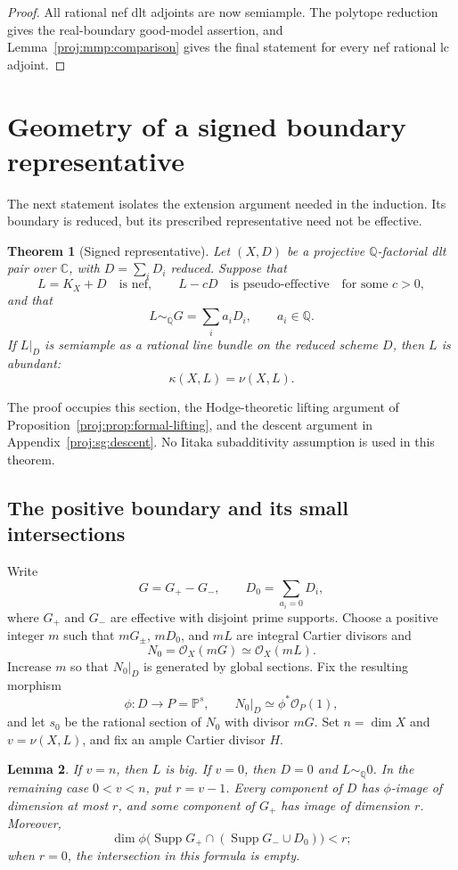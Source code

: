 \documentclass[11pt,letterpaper]{article}
\newcommand{\Q}{\mathbb{Q}}
\newcommand{\C}{\mathbb{C}}
\newcommand{\PP}{\mathbb{P}}
\newcommand{\OO}{\mathcal{O}}
\DeclareMathOperator{\Supp}{Supp}
\newtheorem{theorem}{Theorem}[section]
\newtheorem{lemma}[theorem]{Lemma}
\theoremstyle{definition}
\theoremstyle{remark}
\begin{document}
\begin{proof}
All rational nef dlt adjoints are now semiample.
The polytope reduction gives the real-boundary good-model
assertion, and Lemma~\ref{proj:mmp:comparison} gives the final
statement for every nef rational lc adjoint.
\end{proof}

\section{Geometry of a signed boundary representative}
\label{proj:sg:section}

The next statement isolates the extension argument needed in the
induction.  Its boundary is reduced, but its prescribed representative
need not be effective.

\begin{theorem}[Signed representative]\label{proj:thm:signed}
Let $(X,D)$ be a projective $\Q$-factorial dlt pair over $\C$, with
$D=\sum_iD_i$ reduced.  Suppose that
\[
 L=K_X+D\quad\text{is nef},\qquad L-cD\quad\text{is pseudo-effective}
 \quad\text{for some }c>0,
\]
and that
\[
 L\sim_{\Q}G=\sum_i a_iD_i,\qquad a_i\in\Q.
\]
If $L|_D$ is semiample as a rational line bundle on the reduced scheme
$D$, then $L$ is abundant:
\[
 \kappa(X,L)=\nu(X,L).
\]
\end{theorem}

The proof occupies this section, the Hodge-theoretic lifting argument
of Proposition~\ref{proj:prop:formal-lifting}, and the descent argument in
Appendix~\ref{proj:sg:descent}.  No Iitaka subadditivity assumption is used
in this theorem.

\subsection{The positive boundary and its small intersections}

Write
\[
 G=G_+-G_-,\qquad D_0=\sum_{a_i=0}D_i,
\]
where $G_+$ and $G_-$ are effective with disjoint prime supports.
Choose a positive integer $m$ such that $mG_\pm$, $mD_0$, and $mL$
are integral Cartier divisors and
\[
 N_0=\OO_X(mG)\simeq\OO_X(mL).
\]
Increase $m$ so that $N_0|_D$ is generated by global sections.  Fix the
resulting morphism
\[
 \phi:D\longrightarrow P=\PP^s,\qquad
 N_0|_D\simeq\phi^*\OO_P(1),
\]
and let $s_0$ be the rational section of $N_0$ with divisor $mG$.
Set $n=\dim X$ and $v=\nu(X,L)$, and fix an ample Cartier divisor $H$.

\begin{lemma}\label{proj:sg:numerical-boundary}
If $v=n$, then $L$ is big.  If $v=0$, then $D=0$ and
$L\sim_{\Q}0$.  In the remaining case $0<v<n$, put $r=v-1$.
Every component of $D$ has $\phi$-image of dimension at most $r$,
and some component of $G_+$ has image of dimension $r$.
Moreover,
\[
 \dim\phi\bigl(\Supp G_+\cap(\Supp G_-\cup D_0)\bigr)<r;
\]
when $r=0$, the intersection in this formula is empty.
\end{lemma}
\end{document}
